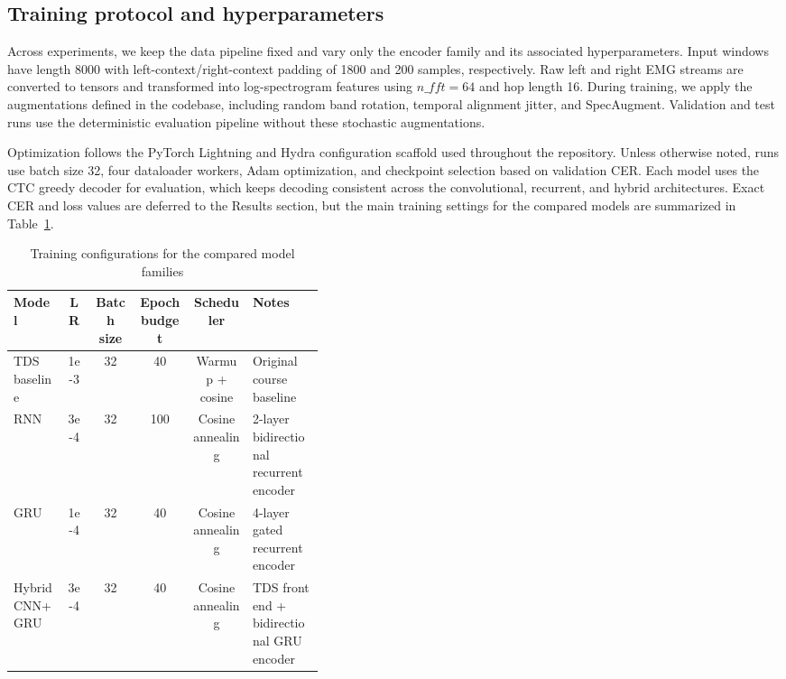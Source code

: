 \documentclass{article}
\begin{document}
\subsection{Training protocol and hyperparameters}

Across experiments, we keep the data pipeline fixed and vary only the encoder
family and its associated hyperparameters. Input windows have length 8000 with
left-context/right-context padding of 1800 and 200 samples, respectively. Raw
left and right EMG streams are converted to tensors and transformed into
log-spectrogram features using $n\_fft=64$ and hop length 16. During training,
we apply the augmentations defined in the codebase, including random band
rotation, temporal alignment jitter, and SpecAugment. Validation and test runs
use the deterministic evaluation pipeline without these stochastic
augmentations.

Optimization follows the PyTorch Lightning and Hydra configuration scaffold
used throughout the repository. Unless otherwise noted, runs use batch size 32,
four dataloader workers, Adam optimization, and checkpoint selection based on
validation CER\@. Each model uses the CTC greedy decoder for evaluation, which
keeps decoding consistent across the convolutional, recurrent, and hybrid
architectures. Exact CER and loss values are deferred to the Results section,
but the main training settings for the compared models are summarized in
Table~\ref{tab:hyperparameters}.

\begin{table}[t]
	\caption{Training configurations for the compared model families}
	\label{tab:hyperparameters}
	\centering
	\begin{tabular}{p{0.17\linewidth}ccccp{0.23\linewidth}}
		\toprule
		Model          & LR   & Batch size & Epoch budget & Scheduler        & Notes                                     \\
		\midrule
		TDS baseline   & 1e-3 & 32         & 40           & Warmup + cosine  & Original course baseline                  \\
		RNN            & 3e-4 & 32         & 100          & Cosine annealing & 2-layer bidirectional recurrent encoder   \\
		GRU            & 1e-4 & 32         & 40           & Cosine annealing & 4-layer gated recurrent encoder           \\
		Hybrid CNN+GRU & 3e-4 & 32         & 40           & Cosine annealing & TDS front end + bidirectional GRU encoder \\
		\bottomrule
	\end{tabular}
\end{table}
\end{document}
